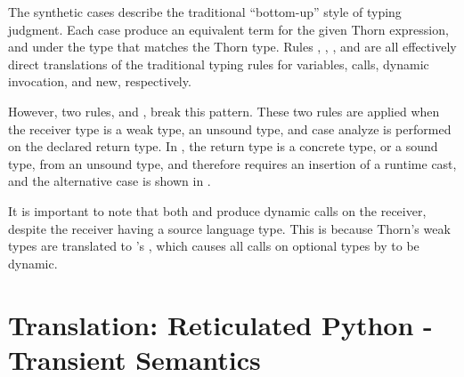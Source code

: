 \documentclass[a4paper,USenglish]{tex/lipics-v2016}
\begin{document}
The synthetic cases describe the traditional ``bottom-up'' style of typing
judgment. Each case produce an equivalent  \kafka term for the given Thorn
expression, and under the \kafka type that matches the Thorn type. Rules
, , , and  are all
effectively  direct translations of the traditional typing rules for variables,
calls, dynamic invocation, and new, respectively.

However, two rules,  and , break this pattern. These
two rules are applied when the receiver type is a weak type, an unsound type,
and case analyze is performed on the declared return type. In ,
the return type is a concrete type, or a sound type,  from an unsound type, and
therefore requires an insertion of a runtime cast, and the alternative case is
shown in .

It is important to note that both  and  produce
dynamic calls on the receiver, despite the  receiver having a source language
type. This is because Thorn's weak types are translated to \kafka's \any, which
causes  all calls on optional types by \kafka to be dynamic.

% 
% 
% 
% 

\section{Translation: Reticulated Python - Transient Semantics}
\end{document}
